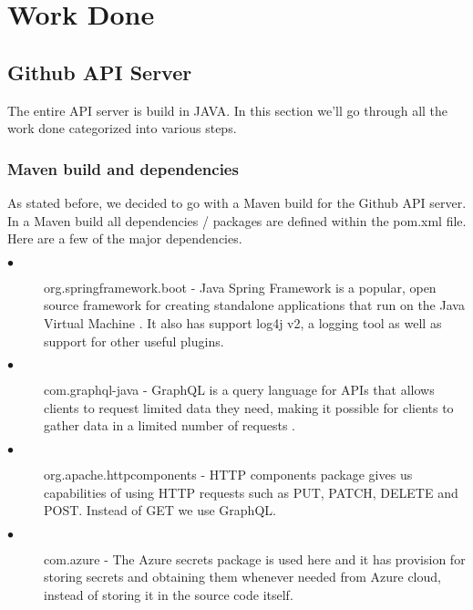 
\chapter{Work Done} %

\label{Chapter 3} %



\section{Github API Server}
The entire API server is build in JAVA. In this section we'll go through all the work done categorized into various steps.
\subsection{Maven build and dependencies}
As stated before, we decided to go with a Maven build for the Github API server. In a Maven build all dependencies / packages are defined within the pom.xml file. Here are a few of the major dependencies.

\begin{description}

\item[$\bullet$] org.springframework.boot - Java Spring Framework is a popular, open source framework for creating standalone applications that run on the Java Virtual Machine \cite{SpringBootIntro}. It also has support log4j v2, a logging tool as well as support for other useful plugins.

\item[$\bullet$] com.graphql-java - GraphQL is a query language for APIs that allows clients to request limited data they need, making it possible for clients to gather data in a limited number of requests \cite{GraphQLIntro}.

\item[$\bullet$] org.apache.httpcomponents - HTTP components package gives us capabilities of using HTTP requests such as PUT, PATCH, DELETE and POST. Instead of GET we use GraphQL.

\item[$\bullet$] com.azure - The Azure secrets package is used here and it has provision for storing secrets and obtaining them whenever needed from Azure cloud, instead of storing it in the source code itself.

\end{description}

